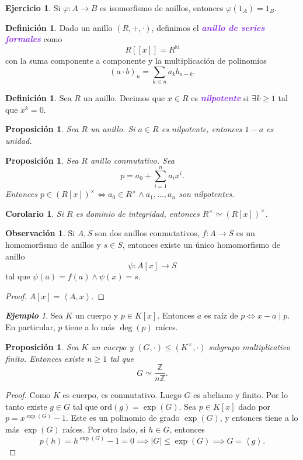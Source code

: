 \documentclass{article}
\newtheorem{corollary}[theorem]{Corolario}
\newtheorem{proposition}[theorem]{Proposición}
\theoremstyle{definition}
\newtheorem{definition}[theorem]{Definición}
\newtheorem{exercise}{Ejercicio}
\newtheorem*{obs}{Observación}
\theoremstyle{remark}
\newtheorem{example}[theorem]{\textbf{Ejemplo}}
\numberwithin{equation}{section}
\newcommand{\N}{\mathbb{N}}
\newcommand{\Z}{\mathbb{Z}}
\newcommand{\vphi}{\varphi}
\renewcommand{\c}{\cdot}
\newcommand{\ord}{\mathrm{ord}}
\newcommand{\abs}[1]{\left| #1 \right|}
\newcommand{\br}[1]{\left( #1 \right)}
\newcommand{\gen}[1]{\left\langle #1 \right\rangle}
\newcommand{\znz}[1]{\frac{\Z}{#1 \Z}}
\newcommand{\wea}[1]{\textcolor{BlueViolet}{\textbf{\emph{#1}}}}
\begin{document}
\begin{exercise}
  Si $\vphi \colon A \to B$ es isomorfismo de anillos, entonces $\vphi(1_A) = 1_B$.
\end{exercise}

\begin{definition}
  Dado un anillo $(R,+,\c)$, definimos el \wea{anillo de series formales} como 
  \[ R[[x]] = R^\N \]
  con la suma componente a componente y la multiplicación de polinomios 
  \[ (a \c b)_n = \sum_{k \leq n} a_k b_{n-k}. \]
\end{definition}

\begin{definition}
  Sea $R$ un anillo. Decimos que $x \in R$ es \wea{nilpotente} si $\exists k \geq 1$ tal que $x^k = 0$.
\end{definition}

\begin{proposition}
  Sea $R$ un anillo. Si $a \in R$ es nilpotente, entonces $1-a$ es unidad. %
\end{proposition}

\begin{proposition}
  Sea $R$ anillo conmutativo. Sea 
  \[ p = a_0 + \sum_{i=1}^n a_i x^i. \]
  Entonces $p \in \br{R[x]}^\times \iff a_0 \in R^\times \land a_1,\dots,a_n$ son nilpotentes.
\end{proposition}

\begin{corollary}
  Si $R$ es dominio de integridad, entonces $R^\times \simeq (R[x])^\times$.
\end{corollary}

\begin{obs}
  Si $A,S$ son dos anillos conmutativos, $f \colon A \to S$ es un homomorfismo de anillos y $s \in S$, entonces existe un único homomorfismo de anillo 
  \[ \psi \colon A[x] \to S \]
  tal que $\psi(a) = f(a) \land \psi(x) = s$.
\end{obs}
\begin{proof}
  $A[x] = \gen{A,x}$.
\end{proof}

\begin{example}
  Sea $K$ un cuerpo y $p \in K[x]$. Entonces $a$ es raíz de $p \iff x-a \mid p$.
  En particular, $p$ tiene a lo más $\deg(p)$ raíces.
\end{example}

\begin{proposition}
  Sea $K$ un cuerpo y $(G,\c) \leqslant (K^\times,\c)$ subgrupo multiplicativo finito. Entonces existe $n \geq 1$ tal que 
  \[ G \simeq \znz n. \]
\end{proposition}
\begin{proof}
  Como $K$ es cuerpo, es conmutativo. Luego $G$ es abeliano y finito. Por lo tanto existe $g \in G$ tal que $\ord(g) = \exp(G)$. Sea $p \in K[x]$ dado por $p = x^{\exp(G)} - 1$. Este es un polinomio de grado $\exp(G)$, y entonces tiene a lo más $\exp(G)$ raíces.
  Por otro lado, si $h \in G$, entonces 
  \[ p(h) = h^{\exp(G)} - 1 = 0
  \implies \abs G \leq \exp(G) \implies G = \gen g. \]
\end{proof}
\end{document}
